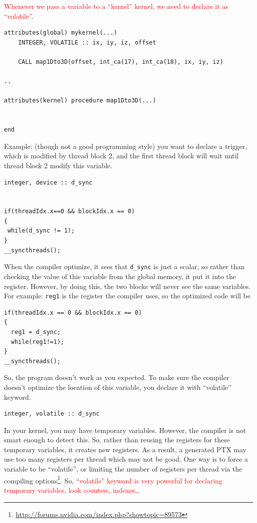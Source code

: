 \textcolor{red}{Whenever we pass a variable to a ``kernel'' kernel, we need to
declare it as ``volatile''}.
\begin{verbatim}
attributes(global) mykernel(...)
    INTEGER, VOLATILE :: ix, iy, iz, offset

    CALL map1Dto3D(offset, int_ca(17), int_ca(18), ix, iy, iz)
    
..

attributes(kernel) procedure map1Dto3D(...) 


end 
\end{verbatim}


 Example: (though not a good programming style) you
want to declare a trigger, which is modified by thread block 2, and the first thread block will wait until thread block 2 modify this variable.
\begin{verbatim}
integer, device :: d_sync


if(threadIdx.x==0 && blockIdx.x == 0)
{
 while(d_sync != 1);
}
__syncthreads();
\end{verbatim}
When the compiler optimize, it sees that \verb!d_sync! is just a scalar, so
rather than checking the value of this variable from the global memory, it put
it into the register. However, by doing this, the two blocks will never see the
same variables. For example: \verb!reg1! is the register the compiler
uses, so the optimized code will be
\begin{verbatim}
if(threadIdx.x == 0 && blockIdx.x == 0)
{
  reg1 = d_sync;
  while(reg1!=1);
}
__syncthreads();
\end{verbatim}


So, the program doesn't work as you expected. To make sure the
compiler doesn't optimize the location of this variable, you declare it with
``volatile'' keyword.
\begin{verbatim}
integer, volatile :: d_sync
\end{verbatim}

In your kernel, you may have temporary variables. However, the compiler is not
smart enough to detect this. So, rather than reusing the registers for these
temporary variables, it creates new registers. As a result, a generated PTX may
use too many registers per thread which may not be good. One way is to force a
variable to be ``volatile'', or limiting the number of registers per thread via
the compiling
options\footnote{\url{http://forums.nvidia.com/index.php?showtopic=89573}}. So,
\textcolor{red}{``volatile'' keyword is very powerful for declaring temporary
variables, look counters, indexes\ldots}

